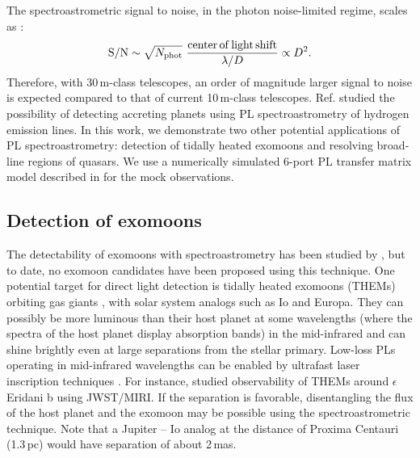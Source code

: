 \documentclass[]{AO4ELT}  %
\begin{document}
The spectroastrometric signal to noise, in the photon noise-limited regime, scales as \cite{whe08}:
\begin{equation}
    {\rm S/N} \sim \sqrt{N_{\rm phot}} \,\,\frac{{\rm center\,of\,light\,shift}}{\lambda/D} \propto D^2.
\end{equation}
Therefore, with 30\,m-class telescopes, an order of magnitude larger signal to noise is expected compared to that of current 10\,m-class telescopes. Ref. \cite{kim22} studied the possibility of detecting accreting planets using PL spectroastrometry of hydrogen emission lines. In this work, we demonstrate two other potential applications of PL spectroastrometry: detection of tidally heated exomoons and resolving broad-line regions of quasars. We use a numerically simulated 6-port PL transfer matrix model described in \cite{kim22} for the mock observations.

\subsection{Detection of exomoons}\label{ssec:exomoon}



The detectability of exomoons with spectroastrometry has been studied by \cite{ago15}, but to date, no exomoon candidates have been proposed using this technique. One potential target for direct light detection is tidally heated exomoons (THEMs) orbiting gas giants \cite{lim13}, with solar system analogs such as Io and Europa. They can possibly be more luminous than their host planet at some wavelengths (where the spectra of the host planet display absorption bands) in the mid-infrared and can shine brightly even at large separations from the stellar primary. Low-loss PLs operating in mid-infrared wavelengths can be enabled by ultrafast laser inscription techniques \cite{arr14}. For instance, \cite{kle23} studied observability of THEMs around $\epsilon$ Eridani b using JWST/MIRI. If the separation is favorable, disentangling the flux of the host planet and the exomoon may be possible using the spectroastrometric technique. Note that a Jupiter -- Io analog at the distance of Proxima Centauri (1.3\,pc) would have separation of about 2\,mas. 
\end{document}
